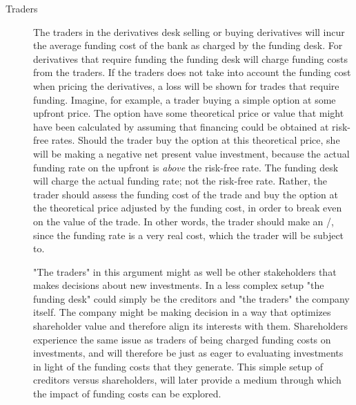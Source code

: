 \documentclass[../../../main.tex]{subfiles}
\begin{document}
        \begin{description}
            \item[Traders]
            The traders in the derivatives desk selling or buying derivatives 
            will incur the average funding cost of the bank as charged by the funding desk.
            For derivatives that require funding the funding desk will charge funding costs from the traders.
            If the traders does not take into account the funding cost when pricing the derivatives,
            a loss will be shown for trades that require funding.
            Imagine, for example, a trader buying a simple option at some upfront price.
            The option have some theoretical price or value that might have been calculated by assuming
            that financing could be obtained at risk-free rates. 
            Should the trader buy the option at this theoretical price, 
            she will be making a negative net present value investment, 
            because the actual funding rate on the upfront is \textit{above} the risk-free rate. 
            The funding desk will charge the actual funding rate; not the risk-free rate.
            Rather, the trader should assess the funding cost of the trade 
            and buy the option at the theoretical price adjusted by the funding cost,
            in order to break even on the value of the trade.
            In other words, the trader should make an \FVA/, 
            since the funding rate is a very real cost, which the trader will be subject to.
            
            "The traders" in this argument might as well be other stakeholders that makes decisions about new investments.
            In a less complex setup "the funding desk" could simply be the creditors and "the traders" the company itself.
            The company might be making decision in a way that optimizes shareholder value
            and therefore align its interests with them.
            Shareholders experience the same issue as traders of being charged funding costs on investments, 
            and will therefore be just as eager to evaluating investments in light of the funding costs that they generate.
            This simple setup of creditors versus shareholders, 
            will later provide a medium through which the impact of funding costs can be explored.


\end{description}
\end{document}
